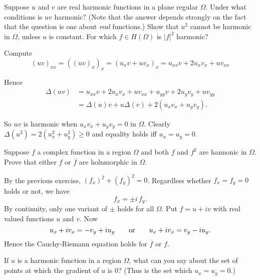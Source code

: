 \begin{enumerate}

\begin{excopy}
Suppose $u$ and $v$ are real harmonic functions in a plane regular \(\Omega\).
Under what conditions is \(uv\) harmonic?
(Note that the answer depends strongly on the fact that the question
is one about \emph{real} functions.)
Show that \(u^2\) cannot be harmonic in \(\Omega\), unless $u$ is constant.
For which \(f \in H(\Omega)\) is \(|f|^2\) harmonic?
\end{excopy}

Compute
\begin{equation*}
(uv)_{xx} 
= \left((uv)_x\right)_x
= \left(u_xv + uv_x\right)_x
= u_{xx}v + 2u_xv_x + uv_{xx}
\end{equation*}

Hence
\begin{align*}
\Delta(uv) 
 &= u_{xx}v + 2u_xv_x + uv_{xx} + u_{yy}v + 2u_yv_y + uv_{yy} \\
 &= \Delta(u)v + u\Delta(v) + 2(u_xv_x + u_yv_y).
\end{align*}

So \(uv\) is harmonic when \(u_xv_x + u_yv_y = 0\) in \(\Omega\).
Clearly \(\Delta(u^2) = 2(u_x^2 + u_y^2) \geq 0\)
and equality holds iff \(u_x = u_y = 0\).

\begin{excopy}
Suppose $f$ a complex function in a region \(\Omega\) and both
$f$ and \(f^2\) are hannonic in \(\Omega\). Prove that
either $f$ or \(\overline{f}\) are holnmorphic in \(\Omega\).
\end{excopy}

By the previous exercise, \((f_x)^2 + (f_y)^2 = 0\).
Regardless whether \(f_x = f_y = 0\) holds or not, we have
\begin{equation*}
f_x = \pm i\,f_y.
\end{equation*}
By continuity, only one variant of \(\pm\) holds for all \(\Omega\).
Put \(f = u + iv\) with real valued functions $u$ and $v$.
Now
\begin{equation*}
u_x + iv_x = -v_y + iu_y
\qquad\textnormal{or}\qquad
u_x + iv_x = v_y - iu_y.
\end{equation*}
Hence the Cauchy-Riemann equation holds for \(\overline{f}\) or $f$.

\begin{excopy}
If $u$ is a harmonic function in a region \(\Omega\),
what can you say about the set of points at which the
gradient of $u$ is $0$? (Thus is the set which \(u_x = u_y = 0\).)
\end{excopy}


\end{enumerate}
